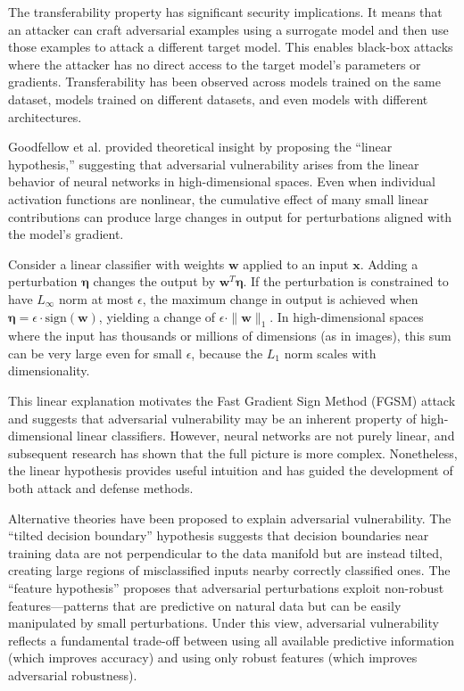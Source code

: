\documentclass[12pt,a4paper]{article}
\begin{document}
The transferability property has significant security implications. It means that an attacker can craft adversarial examples using a surrogate model and then use those examples to attack a different target model. This enables black-box attacks where the attacker has no direct access to the target model's parameters or gradients. Transferability has been observed across models trained on the same dataset, models trained on different datasets, and even models with different architectures.

Goodfellow et al. \cite{goodfellow2015} provided theoretical insight by proposing the ``linear hypothesis,'' suggesting that adversarial vulnerability arises from the linear behavior of neural networks in high-dimensional spaces. Even when individual activation functions are nonlinear, the cumulative effect of many small linear contributions can produce large changes in output for perturbations aligned with the model's gradient.

Consider a linear classifier with weights $\mathbf{w}$ applied to an input $\mathbf{x}$. Adding a perturbation $\boldsymbol{\eta}$ changes the output by $\mathbf{w}^T \boldsymbol{\eta}$. If the perturbation is constrained to have $L_\infty$ norm at most $\epsilon$, the maximum change in output is achieved when $\boldsymbol{\eta} = \epsilon \cdot \text{sign}(\mathbf{w})$, yielding a change of $\epsilon \cdot \|\mathbf{w}\|_1$. In high-dimensional spaces where the input has thousands or millions of dimensions (as in images), this sum can be very large even for small $\epsilon$, because the $L_1$ norm scales with dimensionality.

This linear explanation motivates the Fast Gradient Sign Method (FGSM) attack and suggests that adversarial vulnerability may be an inherent property of high-dimensional linear classifiers. However, neural networks are not purely linear, and subsequent research has shown that the full picture is more complex. Nonetheless, the linear hypothesis provides useful intuition and has guided the development of both attack and defense methods.

Alternative theories have been proposed to explain adversarial vulnerability. The ``tilted decision boundary'' hypothesis suggests that decision boundaries near training data are not perpendicular to the data manifold but are instead tilted, creating large regions of misclassified inputs nearby correctly classified ones. The ``feature hypothesis'' proposes that adversarial perturbations exploit non-robust features---patterns that are predictive on natural data but can be easily manipulated by small perturbations. Under this view, adversarial vulnerability reflects a fundamental trade-off between using all available predictive information (which improves accuracy) and using only robust features (which improves adversarial robustness).
\end{document}
